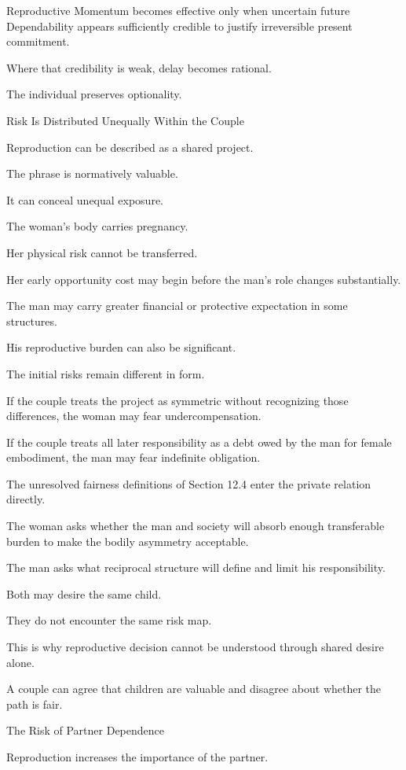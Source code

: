 Reproductive Momentum becomes effective only when uncertain future Dependability appears sufficiently credible to justify irreversible present commitment.

Where that credibility is weak, delay becomes rational.

The individual preserves optionality.

Risk Is Distributed Unequally Within the Couple

Reproduction can be described as a shared project.

The phrase is normatively valuable.

It can conceal unequal exposure.

The woman’s body carries pregnancy.

Her physical risk cannot be transferred.

Her early opportunity cost may begin before the man’s role changes substantially.

The man may carry greater financial or protective expectation in some structures.

His reproductive burden can also be significant.

The initial risks remain different in form.

If the couple treats the project as symmetric without recognizing those differences, the woman may fear undercompensation.

If the couple treats all later responsibility as a debt owed by the man for female embodiment, the man may fear indefinite obligation.

The unresolved fairness definitions of Section 12.4 enter the private relation directly.

The woman asks whether the man and society will absorb enough transferable burden to make the bodily asymmetry acceptable.

The man asks what reciprocal structure will define and limit his responsibility.

Both may desire the same child.

They do not encounter the same risk map.

This is why reproductive decision cannot be understood through shared desire alone.

A couple can agree that children are valuable and disagree about whether the path is fair.

The Risk of Partner Dependence

Reproduction increases the importance of the partner.

